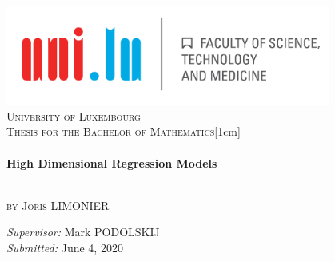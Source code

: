 \begin{titlepage}
	\begin{center}
		\includegraphics[width=0.8\textwidth]{images/logo.png}\\[2cm]
		\textsc{\LARGE University of Luxembourg}\\[2cm]
		\textsc{\Large Thesis for the Bachelor of Mathematics}[1cm]\\
		\vspace{1cm}
		\HRule \\[0.7cm]
		
		{ \Huge \bfseries High Dimensional Regression Models}\\[0.4cm]
		
		\HRule \\[1.5cm]
		
		 \vspace{.5cm}
		
		\large
		\textsc{by} \textsc{\Large Joris LIMONIER}\\ %
		
		\vfill
		
		\emph{Supervisor:} Mark PODOLSKIJ\\
		\emph{Submitted:} June 4, 2020
	\end{center}
\end{titlepage}

